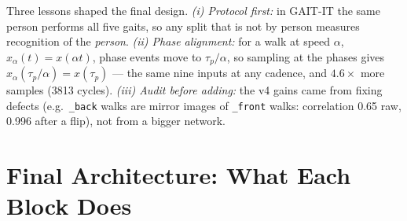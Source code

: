 \documentclass[conference]{IEEEtran}
\begin{document}
Three lessons shaped the final design. \emph{(i) Protocol first:} in GAIT-IT
the same person performs all five gaits, so any split that is not by person
measures recognition of the \emph{person}. \emph{(ii) Phase alignment:} for a
walk at speed $\alpha$, $x_\alpha(t)=x(\alpha t)$, phase events move to
$\tau_p/\alpha$, so sampling at the phases gives
$x_\alpha(\tau_p/\alpha)=x(\tau_p)$ --- the same nine inputs at any cadence,
and $4.6\times$ more samples (3813 cycles). \emph{(iii) Audit before adding:}
the v4 gains came from fixing defects (e.g.\ \texttt{\_back} walks are mirror
images of \texttt{\_front} walks: correlation 0.65 raw, 0.996 after a flip), not
from a bigger network.

\section{Final Architecture: What Each Block Does}
\end{document}
